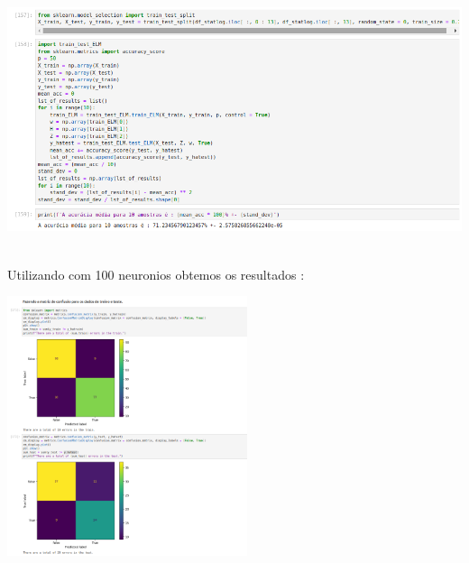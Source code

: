 \documentclass{article}
\begin{document}
\begin{center}
\begin{center}
\end{center}

\begin{center}

\includegraphics[height=3in]{Ex6/Hearth_Disease/acc_50.png}
\vspace{10pt}

\end{center}



\vspace{5pt}
Utilizando com 100 neuronios obtemos os resultados : 

\begin{center}

\includegraphics[height=3in]{Ex6/Hearth_Disease/conf_mat_100.png}
\vspace{10pt}

\end{center}

\begin{center}


\end{center}
\end{center}
\end{document}
